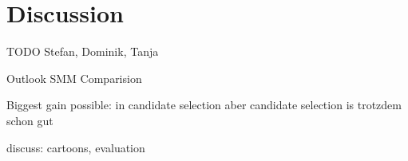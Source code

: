 \section{Discussion}
\label{sec_discussion}

TODO Stefan, Dominik, Tanja

Outlook SMM Comparision

Biggest gain possible: in candidate selection
aber candidate selection is trotzdem schon gut

discuss: cartoons, evaluation
